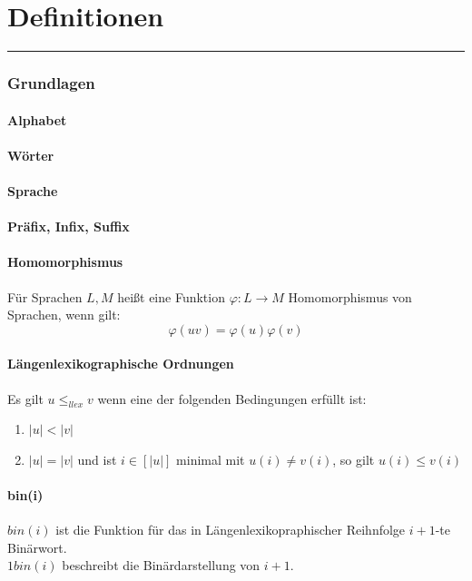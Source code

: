 \documentclass[DIV=15]{scrartcl}
\begin{document}
\part{Definitionen}
\rule{467.1pt}{0.4pt}
\section{Grundlagen}
    \subsection{Alphabet}
    \subsection{Wörter}
    \subsection{Sprache}
    \subsection{Präfix, Infix, Suffix}
    \subsection{Homomorphismus}
        Für Sprachen \(L,M\) heißt eine Funktion \(\varphi:L\to M\) 
        Homomorphismus von Sprachen, wenn gilt: \[\varphi(uv) = \varphi(u)\varphi(v)\]
    \subsection{Längenlexikographische Ordnungen}
        Es gilt \(u \leq_{llex} v\) wenn eine der folgenden Bedingungen erfüllt ist:
        \begin{enumerate}
            \item \(|u|<|v|\)
            \item \(|u|=|v|\) und ist \(i\in[|u|]\) minimal mit \(u(i)\ne v(i)\), so gilt \(u(i)\leq v(i)\)
        \end{enumerate}
    \subsection{bin(i)}
    \(bin(i)\) ist die Funktion für das in Längenlexikopraphischer Reihnfolge \(i+1\)-te Binärwort.\\
    \(1bin(i)\) beschreibt die Binärdarstellung von \(i+1\).
\end{document}
